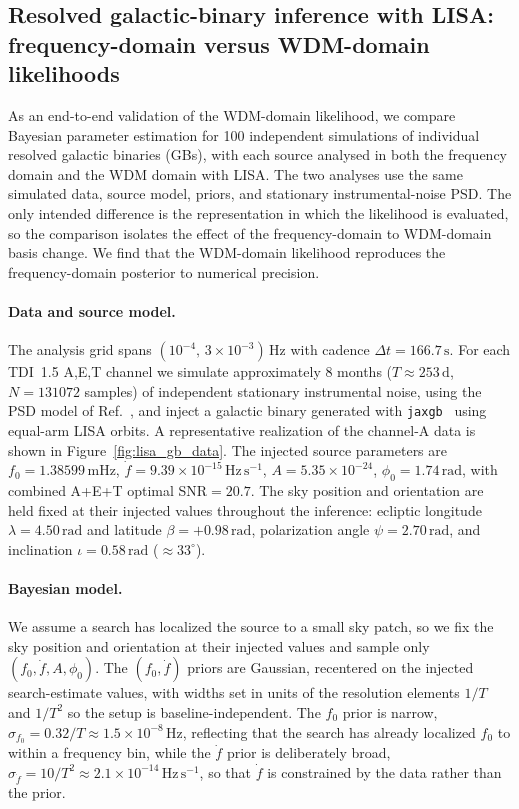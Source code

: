 \documentclass[twocolumn,preprintnumbers,
  superscriptaddress,
  nofootinbib,
  amsmath,
  amssymb,
  aps,
  prd,
  colorlinks=true,
  linkcolor=blue,
  urlcolor=blue,
  citecolor=blue,
  anchorcolor=blue
]{revtex4-2}
\begin{document}
\subsection{Resolved galactic-binary inference with LISA: frequency-domain versus WDM-domain likelihoods}
\label{sec:lisa_gb}

As an end-to-end validation of the WDM-domain likelihood, we compare Bayesian parameter estimation for 100 independent simulations of individual resolved galactic binaries (GBs), with each source analysed in both the frequency domain and the WDM domain with LISA. The two analyses use the same simulated data, source model, priors, and stationary instrumental-noise PSD. The only intended difference is the representation in which the likelihood is evaluated, so the comparison isolates the effect of the frequency-domain to WDM-domain basis change. 
We find that the WDM-domain likelihood reproduces the frequency-domain posterior to numerical precision.

\paragraph{Data and source model.}
The analysis grid spans $(10^{-4},\,3\times10^{-3})\,\mathrm{Hz}$ with cadence $\Delta t = 166.7\,\mathrm{s}$. For each TDI~1.5 A,E,T channel we simulate approximately 8 months ($T\approx253\,\mathrm{d}$, $N = 131072$ samples) of independent stationary instrumental noise, using the PSD model of Ref.~\cite{LISACosmologyWorkingGroup:2022kbp}, and inject a galactic binary generated with \texttt{jaxgb}~\cite{jaxgb} using equal-arm LISA orbits. A representative realization of the channel-A data is shown in Figure~\ref{fig:lisa_gb_data}. The injected source parameters are $f_0 = 1.38599\,\mathrm{mHz}$, $\dot f = 9.39\times10^{-15}\,\mathrm{Hz\,s^{-1}}$, $A = 5.35\times10^{-24}$, $\phi_0 = 1.74\,\mathrm{rad}$, with combined A+E+T optimal SNR$=20.7$. The sky position and orientation are held fixed at their injected values throughout the inference: ecliptic longitude $\lambda = 4.50\,\mathrm{rad}$ and latitude $\beta = +0.98\,\mathrm{rad}$, polarization angle $\psi = 2.70\,\mathrm{rad}$, and inclination $\iota = 0.58\,\mathrm{rad}$ ($\approx 33^\circ$).

\paragraph{Bayesian model.}
We assume a search has localized the source to a small sky patch, so we fix the sky position and orientation at their injected values and sample only $(f_0,\dot f,A,\phi_0)$. The $(f_0,\dot f)$ priors are Gaussian, recentered on the injected search-estimate values, with widths set in units of the resolution elements $1/T$ and $1/T^2$ so the setup is baseline-independent. The $f_0$ prior is narrow, $\sigma_{f_0}=0.32/T\approx1.5\times10^{-8}\,\mathrm{Hz}$, reflecting that the search has already localized $f_0$ to within a frequency bin, while the $\dot f$ prior is deliberately broad, $\sigma_{\dot f}=10/T^2\approx2.1\times10^{-14}\,\mathrm{Hz\,s^{-1}}$, so that $\dot f$ is constrained by the data rather than the prior.
\end{document}
